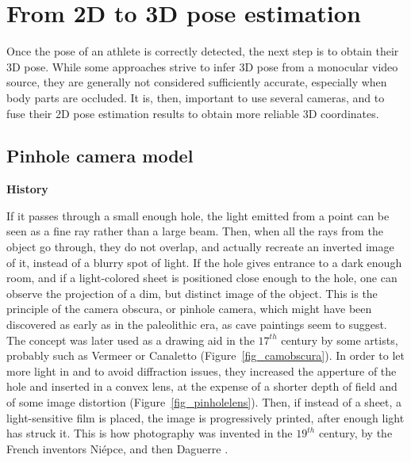 \FloatBarrier
\section{From 2D to 3D pose estimation}\label{sec:3D reconstruction}
\label{ch:2.2}

Once the pose of an athlete is correctly detected, the next step is to obtain their 3D pose. While some approaches strive to infer 3D pose from a monocular video source, they are generally not considered sufficiently accurate, especially when body parts are occluded. It is, then, important to use several cameras, and to fuse their 2D pose estimation results to obtain more reliable 3D coordinates.


\subsection{Pinhole camera model}\label{subsec:Pinhole model}

\noindent\textbf{History}

If it passes through a small enough hole, the light emitted from a point can be seen as a fine ray rather than a large beam. Then, when all the rays from the object go through, they do not overlap, and actually recreate an inverted image of it, instead of a blurry spot of light. If the hole gives entrance to a dark enough room, and if a light-colored sheet is positioned close enough to the hole, one can observe the projection of a dim, but distinct image of the object. This is the principle of the camera obscura, or pinhole camera, which might have been discovered as early as in the paleolithic era, as cave paintings seem to suggest. The concept was later used as a drawing aid in the $17^{th}$ century by some artists, probably such as Vermeer or Canaletto \cite{Steadman2001} (Figure~\ref{fig_camobscura}). In order to let more light in and to avoid diffraction issues, they increased the apperture of the hole and inserted in a convex lens, at the expense of a shorter depth of field and of some image distortion (Figure~\ref{fig_pinholelens}). Then, if instead of a sheet, a light-sensitive film is placed, the image is progressively printed, after enough light has struck it. This is how photography was invented in the $19^{th}$ century, by the French inventors Niépce, and then Daguerre \cite{Marignier1999}.


